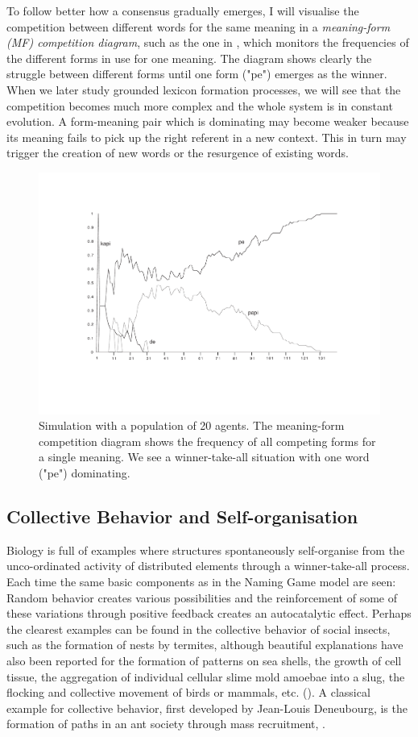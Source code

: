 To follow better how a consensus gradually emerges, I will visualise
the competition between different words for the same meaning
in a {\itshape meaning-form (MF) competition diagram}, 
such as the one in , which monitors 
the frequencies of the different forms in use for one meaning.
The diagram shows clearly the struggle between different forms until
one form ("pe") emerges as the winner. When we later study 
grounded lexicon formation processes, we will see that the 
competition becomes much more complex and the whole system 
is in constant evolution. A form-meaning pair which is 
dominating may become weaker because its meaning
fails to pick up the right
referent in a new context. 
This in turn may trigger the creation of new words or the 
resurgence of existing words. 
\begin{figure}[htbp]
  \centerline{\includegraphics[width=.70\textwidth]{chap5/figs/comp1}}
\caption{\label{competition} Simulation with 
a population of 20 agents. The meaning-form competition 
diagram shows the frequency of all competing forms for a 
single meaning. We see a winner-take-all situation
with one word ("pe") dominating.}
\end{figure}

\subsection{Collective Behavior and Self-organisation}

Biology is full of examples where structures spontaneously 
self-organise from the unco-ordinated activity 
of distributed elements through a winner-take-all process.
Each time the same basic components as in the Naming Game model
are seen: Random behavior creates various possibilities and the 
reinforcement of some of these variations through positive
feedback creates an autocatalytic effect. 
Perhaps the clearest examples can be found 
in the collective behavior of 
social insects, such as the formation of nests by termites, 
although beautiful explanations have also been reported
for the formation of patterns on sea shells, the growth of
cell tissue, the aggregation
of individual cellular slime mold amoebae into a slug, 
the flocking and collective movement of birds or mammals, 
etc. (\cite{Meinhardt:1982}). A classical 
example for collective behavior, first developed by Jean-Louis 
Deneubourg, is the formation of paths in an ant society through 
mass recruitment, \cite{Pasteels:1987}. 

